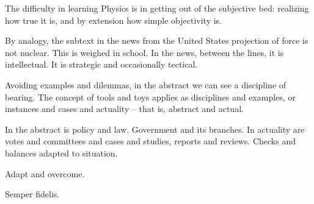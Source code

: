 

The difficulty in learning Physics is in getting out of the subjective
bed: realizing how true it is, and by extension how simple objectivity
is.  

By analogy, the subtext in the news from the United States projection
of force is not nuclear.  This is weighed in school.  In the news,
between the lines, it is intellectual.  It is strategic and
occasionally tectical.

Avoiding examples and dilemmas, in the abstract we can see a
discipline of bearing.  The concept of tools and toys applies as
disciplines and examples, or instances and cases and actuality -- that
is, abstract and actual.

In the abstract is policy and law.  Government and its branches.  In
actuality are votes and committees and cases and studies, reports and
reviews.  Checks and balances adapted to situation.

Adapt and overcome.

Semper fidelis.

\bye

